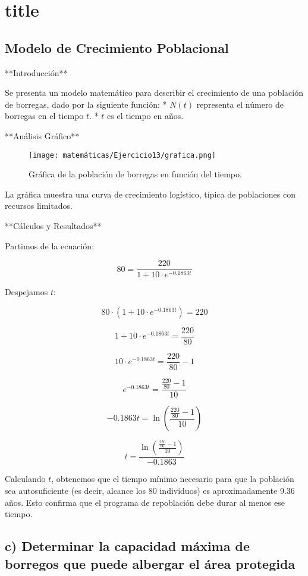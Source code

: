 \chapter*{title}
\section{Modelo de Crecimiento Poblacional}

    **Introducción**

    Se presenta un modelo matemático para describir el crecimiento de una población de borregas, dado por la siguiente función:
    * $N(t)$ representa el número de borregas en el tiempo $t$.
    * $t$ es el tiempo en años.

    **Análisis Gráfico**

    \begin{figure}[h]
    \centering
    \texttt{[image: matemáticas/Ejercicio13/grafica.png]}
    \caption{Gráfica de la población de borregas en función del tiempo.}
    \end{figure}

    La gráfica muestra una curva de crecimiento logístico, típica de poblaciones con recursos limitados.

    **Cálculos y Resultados**

    Partimos de la ecuación:
    
    \[
    80 = \frac{220}{1 + 10 \cdot e^{-0.1863t}}
    \]
    
    Despejamos \( t \):
    
    \[
    80 \cdot \left(1 + 10 \cdot e^{-0.1863t}\right) = 220
    \]
    
    \[
    1 + 10 \cdot e^{-0.1863t} = \frac{220}{80}
    \]
    
    \[
    10 \cdot e^{-0.1863t} = \frac{220}{80} - 1
    \]
    
    \[
    e^{-0.1863t} = \frac{\frac{220}{80} - 1}{10}
    \]
    
    \[
    -0.1863t = \ln\left(\frac{\frac{220}{80} - 1}{10}\right)
    \]
    
    \[
    t = \frac{\ln\left(\frac{\frac{220}{80} - 1}{10}\right)}{-0.1863}
    \]
    
    Calculando \( t \), obtenemos que el tiempo mínimo necesario para que la población sea autosuficiente (es decir, alcance los 80 individuos) es aproximadamente 9.36 años. Esto confirma que el programa de repoblación debe durar al menos ese tiempo.
    
    \section*{c) Determinar la capacidad máxima de borregos que puede albergar el área protegida}
    
